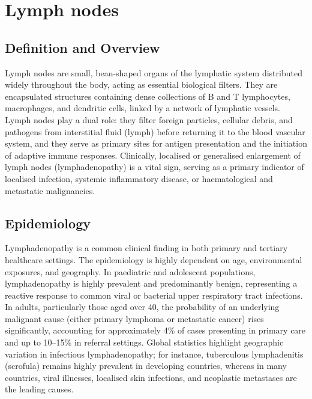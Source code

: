 \chapter{Lymph nodes}

\section*{Definition and Overview}
Lymph nodes are small, bean-shaped organs of the lymphatic system distributed widely throughout the body, acting as essential biological filters. They are encapsulated structures containing dense collections of B and T lymphocytes, macrophages, and dendritic cells, linked by a network of lymphatic vessels. Lymph nodes play a dual role: they filter foreign particles, cellular debris, and pathogens from interstitial fluid (lymph) before returning it to the blood vascular system, and they serve as primary sites for antigen presentation and the initiation of adaptive immune responses. Clinically, localised or generalised enlargement of lymph nodes (lymphadenopathy) is a vital sign, serving as a primary indicator of localised infection, systemic inflammatory disease, or haematological and metastatic malignancies.

\section*{Epidemiology}
Lymphadenopathy is a common clinical finding in both primary and tertiary healthcare settings. The epidemiology is highly dependent on age, environmental exposures, and geography. In paediatric and adolescent populations, lymphadenopathy is highly prevalent and predominantly benign, representing a reactive response to common viral or bacterial upper respiratory tract infections. In adults, particularly those aged over 40, the probability of an underlying malignant cause (either primary lymphoma or metastatic cancer) rises significantly, accounting for approximately 4\% of cases presenting in primary care and up to 10--15\% in referral settings. Global statistics highlight geographic variation in infectious lymphadenopathy; for instance, tuberculous lymphadenitis (scrofula) remains highly prevalent in developing countries, whereas in many countries, viral illnesses, localised skin infections, and neoplastic metastases are the leading causes.

